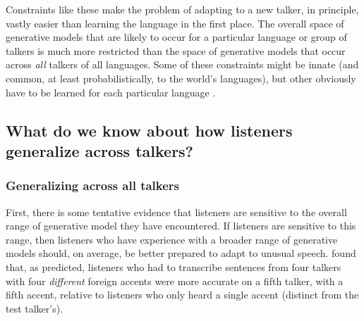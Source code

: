 Constraints like these make the problem of adapting to a new talker, in principle, vastly easier than learning the language in the first place.  The overall space of generative models that are likely to occur for a particular language or group of talkers is much more restricted than the space of generative models that occur across \emph{all} talkers of all languages.  Some of these constraints might be innate (and common, at least probabilistically, to the world's languages), but other obviously have to be learned for each particular language \cite<like the range of mean VOTs allowed for each category>{Lisker1964}.

\subsection{What do we know about how listeners generalize across talkers?}
\label{sec:what-do-we-know-gen}

\subsubsection{Generalizing across all talkers}
\label{sec:gener-across-all}

First, there is some tentative evidence that listeners are sensitive to the overall range of generative model they have encountered.  If listeners are sensitive to this range, then listeners who have experience with a broader range of generative models should, on average, be better prepared to adapt to unusual speech.  found that, as predicted, listeners who had to transcribe sentences from four talkers with four \emph{different} foreign accents were more accurate on a fifth talker, with a fifth accent, relative to listeners who only heard a single accent (distinct from the test talker's).  


